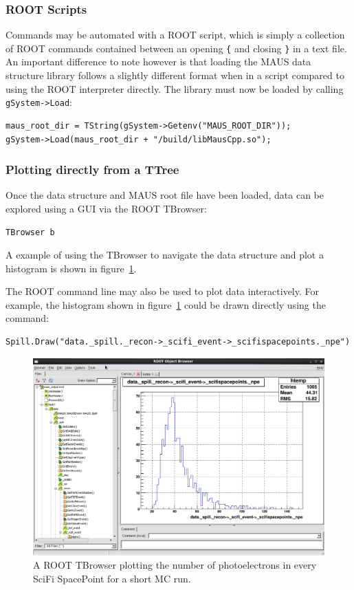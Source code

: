 \documentclass[a4paper,10pt]{article}
\begin{document}
  \subsubsection{ROOT Scripts}
  Commands may be automated with a ROOT script, which is simply a collection of ROOT commands contained between an opening \texttt{\{} and closing \texttt{\}} in a text file. An important difference to note however is that loading the MAUS data structure library follows a slightly different format when in a script compared to using the ROOT interpreter directly.  The library must now be loaded by calling \texttt{gSystem->Load}:
  \begin{lstlisting}
maus_root_dir = TString(gSystem->Getenv("MAUS_ROOT_DIR"));
gSystem->Load(maus_root_dir + "/build/libMausCpp.so");
  \end{lstlisting}

  \subsubsection{Plotting directly from a TTree}
  \label{sec:ROOTPlottingDirectlyFromTTree}
  Once the data structure and MAUS root file have been loaded, data can be explored using a GUI via the ROOT TBrowser:
  \begin{lstlisting}
TBrowser b
  \end{lstlisting}
  A example of using the TBrowser to navigate the data structure and plot a histogram is shown in figure~\ref{fig:NPE}.

  The ROOT command line may also be used to plot data interactively. For example, the histogram shown in figure~\ref{fig:NPE} could be drawn directly using the command:
  \begin{lstlisting}
Spill.Draw("data._spill._recon->_scifi_event->_scifispacepoints._npe")
  \end{lstlisting}

  \begin{figure}[hbt]
    \begin{center}
      \includegraphics[width=0.8\linewidth]{./graphics/MC-SpacePoint-NPE.png}
      \caption{A ROOT TBrowser plotting the number of photoelectrons in every SciFi SpacePoint for a short MC run.}
      \label{fig:NPE}
    \end{center}
  \end{figure}
\end{document}
